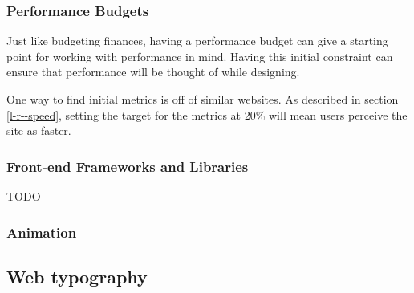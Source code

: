 
\subsubsection{Performance Budgets} \label{l-r--performance-budgets}

Just like budgeting finances, having a performance budget can give a starting point for working with performance in mind. Having this initial constraint can ensure that performance will be thought of while designing. \cite{performance_budget}

One way to find initial metrics is off of similar websites. As described in section \ref{l-r--speed}, setting the target for the metrics at 20\% will mean users perceive the site as faster.

\subsubsection{Front-end Frameworks and Libraries}

TODO


\subsubsection{Animation} \label{l-r--animation}


\subsection{Web typography} \label{l-r--web-type}

